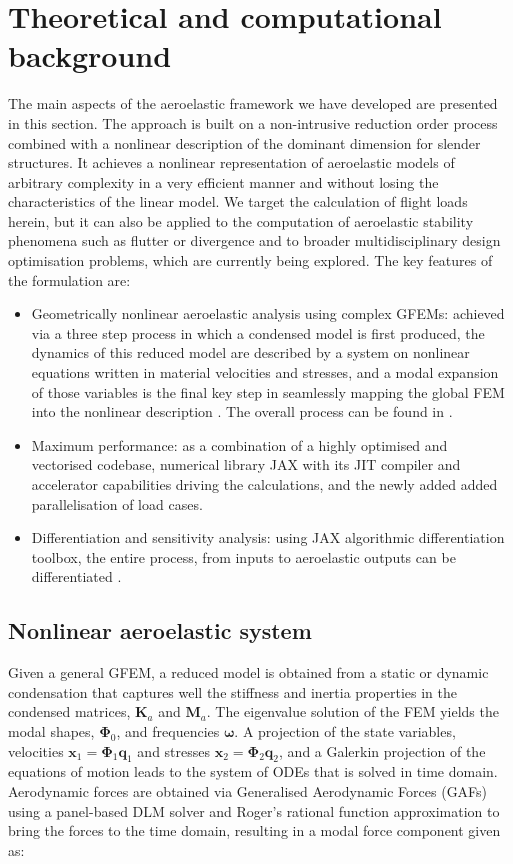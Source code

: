 \documentclass[11pt]{article}
\begin{document}
\section{Theoretical and computational background}
\label{sec:org85f0cd2}
The main aspects of the aeroelastic framework we have developed are presented in this section. 
The approach is built on a non-intrusive reduction order process combined with a nonlinear description of the dominant dimension for slender structures. It achieves a nonlinear representation of aeroelastic models of arbitrary complexity in a very efficient manner and without losing the characteristics of the linear model. We target the calculation of flight loads herein, but it can also be applied to the computation of aeroelastic stability phenomena such as flutter or divergence \cite{CEA2023} and to broader multidisciplinary design optimisation problems, which are currently being explored.
The key features of the formulation are:

\begin{itemize}
\item Geometrically nonlinear aeroelastic analysis using complex GFEMs: achieved via a three step process in which a condensed model is first produced, the dynamics of this reduced model are described by a system on nonlinear equations \cite{HODGES2003} written in material velocities and stresses, and a modal expansion of those variables is the final key step in seamlessly mapping the global FEM into the nonlinear description \cite{PALACIOS2011}. The overall process can be found in \cite{CEA2021a}.
\item Maximum performance: as a combination of a highly optimised and vectorised codebase, numerical library JAX with its JIT compiler and accelerator capabilities  driving the calculations, and the newly added added parallelisation of load cases.
\item Differentiation and sensitivity analysis: using JAX algorithmic differentiation toolbox, the entire process, from inputs to aeroelastic outputs can be differentiated \cite{CEA2024a}.
\end{itemize}

\subsection{Nonlinear aeroelastic system}
\label{sec:org382dc9e}
Given a general GFEM, a reduced model is obtained from a static or dynamic condensation that captures well the stiffness and inertia properties in the condensed matrices, \(\pmb{K}_a\) and \(\pmb{M}_a\). The eigenvalue solution of the FEM yields the modal shapes, \(\pmb \Phi_0\), and frequencies \(\pmb \omega\). A projection of the state variables, velocities \(\pmb{x}_1 = \pmb{\Phi}_1\pmb{q}_1\) and stresses \(\pmb{x}_2 = \pmb{\Phi}_2\pmb{q}_2\), and a Galerkin projection of the equations of motion leads to the system of ODEs that is solved in time domain. 
Aerodynamic forces are obtained via Generalised Aerodynamic Forces (GAFs) using a panel-based DLM solver and Roger's rational function approximation\cite{Roger1977} to bring the forces to the time domain, resulting in a modal force component given as:
\end{document}
